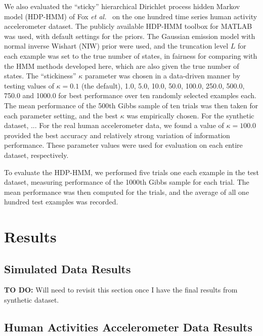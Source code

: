 \documentclass[12pt]{article}
\begin{document}
We also evaluated the ``sticky'' hierarchical Dirichlet process hidden Markov model (HDP-HMM) of Fox \emph{et al.}~\cite{fox2011sticky} on the one hundred time series human activity accelerometer dataset. The publicly available HDP-HMM toolbox for MATLAB~\cite{HDP-HMM-TOOLKIT} was used, with default settings for the priors. The Gaussian emission model with normal inverse Wishart (NIW) prior were used, and the truncation level $L$ for each example was set to the true number of states, in fairness for comparing with the HMM methods developed here, which are also given the true number of states. The ``stickiness'' $\kappa$ parameter was chosen in a data-driven manner by testing values of $\kappa=0.1$ (the default), 1.0, 5.0, 10.0, 50.0, 100.0, 250.0, 500.0, 750.0 and 1000.0 for best performance over ten randomly selected examples each. The mean performance of the 500th Gibbs sample of ten trials was then taken for each parameter setting, and the best $\kappa$ was empirically chosen. For the synthetic dataset, ... For the real human accelerometer data, we found a value of $\kappa=100.0$ provided the best accuracy and relatively strong variation of information performance. These parameter values were used for evaluation on each entire dataset, respectively.

To evaluate the HDP-HMM, we performed five trials one each example in the test dataset, measuring performance of the 1000th Gibbs sample for each trial. The mean performance was then computed for the trials, and the average of all one hundred test examples was recorded.

\section{Results}

\subsection{Simulated Data Results}
\textbf{TO DO:} Will need to revisit this section once I have the final results from synthetic dataset.


\subsection{Human Activities Accelerometer Data Results}\label{sec:quantitative}
\end{document}
